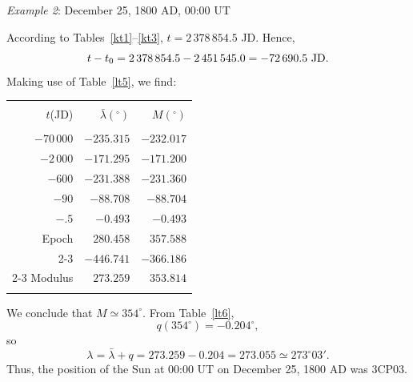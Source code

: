 \begin{center}
{\em Example 2}: December 25, 1800 AD, 00:00 UT
\end{center}
According to Tables~\ref{kt1}--\ref{kt3}, $t = 2\,378\,854.5$ JD. Hence,
$$
 t-t_0 = 2\,378\,854.5-2\,451\,545.0=-72\,690.5~{\rm JD}.
 $$ Making use of
Table~\ref{lt5}, we find:
\begin{center}
\begin{tabular}{rrr}
&&\\
$t$(JD) & $\bar{\lambda}(^\circ)$ & $ M(^\circ)$\\[-2ex]
&&\\
$-70\,000 $& $-235.315$ & $-232.017$\\
$-2\,000$ & $-171.295$ & $-171.200$\\
$-600$ & $-231.388$ & $-231.360$\\
$-90$ & $-88.708$ & $-88.704$\\
$-.5$ & $-0.493$ & $-0.493$\\
Epoch & $280.458$ & $357.588$\\\cline{2-3}
&$-446.741$ & $-366.186$\\\cline{2-3}
Modulus & $273.259$ & $353.814$\\
&&\\
\end{tabular}
\end{center}
We conclude that  $M\simeq 354^\circ$. 
 From Table~\ref{lt6}, 
$$
q(354^\circ)= -0.204^\circ,
$$  
so
$$
\lambda =\bar{\lambda} + q = 273.259 - 0.204=273.055\simeq 273^\circ03'.
$$
 Thus, the position of the Sun at 00:00 UT on December 25, 1800 AD was 3CP03. 
 
